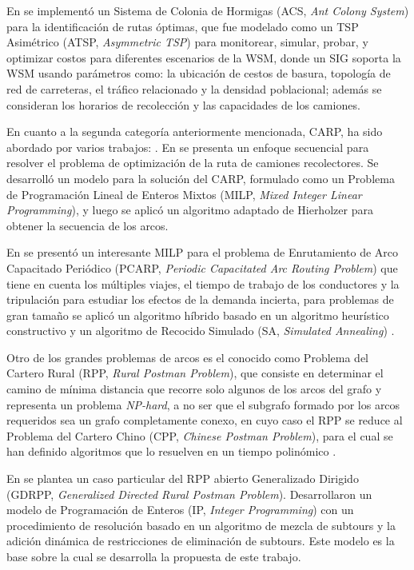 En \citet{Karadimas2007OptimalAlgorithm} se implementó un Sistema de Colonia de Hormigas (ACS, \textit{Ant Colony System}) para la identificación de rutas óptimas, que fue modelado como un TSP Asimétrico (ATSP, \textit{Asymmetric TSP}) para monitorear, simular, probar, y optimizar costos para diferentes escenarios de la WSM, donde un SIG soporta la WSM usando parámetros como: la ubicación de cestos de basura, topología de red de carreteras, el tráfico relacionado y la densidad poblacional; además se consideran los horarios de recolección y las capacidades de los camiones.

En cuanto a la segunda categoría anteriormente mencionada, CARP, ha sido abordado por varios trabajos: \citet{Vecchi2016ACollection,Tirkolaee2018ATime,Braier2017AnArgentina}. En \citet{Vecchi2016ACollection} se presenta un enfoque secuencial para resolver el problema de optimización de la ruta de camiones recolectores. Se desarrolló un modelo para la solución del CARP, formulado como un Problema de Programación Lineal de Enteros Mixtos (MILP, \textit{Mixed Integer Linear Programming}), y luego se aplicó un algoritmo adaptado de Hierholzer para obtener la secuencia de los arcos. 

En \citet{Tirkolaee2018ATime} se presentó un interesante MILP para el problema de Enrutamiento de Arco Capacitado Periódico (PCARP, \textit{Periodic Capacitated Arc Routing Problem}) que tiene en cuenta los múltiples viajes, el tiempo de trabajo de los conductores y la tripulación para estudiar los efectos de la demanda incierta, para problemas de gran tamaño se aplicó un algoritmo híbrido basado en un algoritmo heurístico constructivo y un algoritmo de Recocido Simulado (SA, \textit{Simulated Annealing}) \citep{Bertsimas1993SimulatedAnnealing}.

Otro de los grandes problemas de arcos es el conocido como Problema del Cartero Rural (RPP, \textit{Rural Postman Problem}), que consiste en determinar el camino de mínima distancia que recorre solo algunos de los arcos del grafo y representa un problema \textit{NP-hard}, a no ser que el subgrafo formado por los arcos requeridos sea un grafo completamente conexo, en cuyo caso el RPP se reduce al Problema del Cartero Chino (CPP, \textit{Chinese Postman Problem}), para el cual se han definido algoritmos que lo resuelven en un tiempo polinómico \citep{CalvinoM2011CooperacionPanoramica}.

En \citet{Braier2017AnArgentina} se plantea un caso particular del RPP abierto Generalizado Dirigido (GDRPP, \textit{Generalized Directed Rural Postman Problem}). Desarrollaron un modelo de Programación de Enteros (IP, \textit{Integer Programming}) con un procedimiento de resolución basado en un algoritmo de mezcla de subtours y la adición dinámica de restricciones de eliminación de subtours. Este modelo es la base sobre la cual se desarrolla la propuesta de este trabajo.

